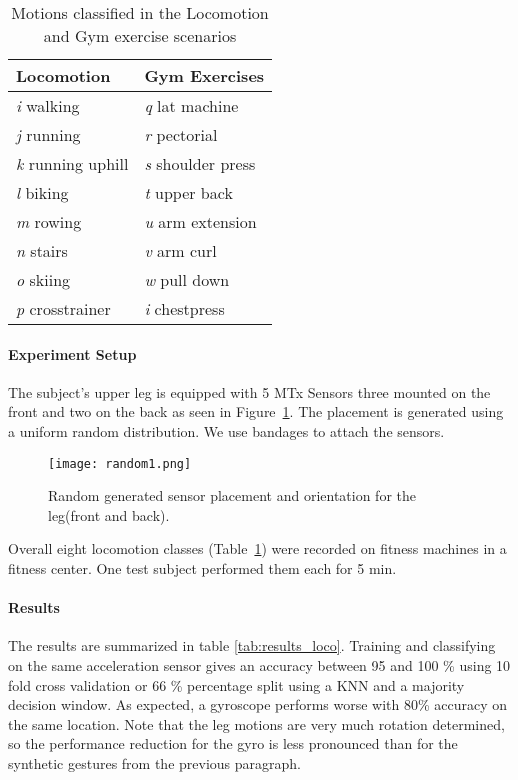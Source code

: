 \begin{table}
\centering 
\caption[Classes assigned in the experiments]{Motions classified in the Locomotion and
  Gym exercise scenarios}
\begin{tabularx}{0.5\textwidth}{ll}\toprule
Locomotion& Gym Exercises\\\midrule \emph{i} walking&\emph{q} lat
machine\\ \emph{j} running&\emph{r} pectorial\\ \emph{k} running
uphill&\emph{s} shoulder press\\ \emph{l} biking&\emph{t} upper
back\\ \emph{m} rowing&\emph{u} arm extension\\ \emph{n}
stairs&\emph{v} arm curl\\ \emph{o} skiing&\emph{w} pull
down\\ \emph{p} crosstrainer&\emph{i} chestpress\\\bottomrule
\end{tabularx}%
\label{tab:classes} 
\end{table}

\paragraph{Experiment Setup}
The subject's upper leg is equipped with 5 MTx Sensors three mounted on the
front and two on the back as seen in Figure~\ref{fig:rand}. The placement is
generated using a uniform random distribution.  We use bandages to attach
the sensors. 
\begin{figure}[t]
\centering   
\texttt{[image: random1.png]}
\caption[Randomly generated placement]{Random generated sensor placement and orientation for the leg(front and back).}
\label{fig:rand}
\end{figure}
Overall eight locomotion classes (Table~\ref{tab:classes}) were recorded
on fitness machines in a  fitness center.
One test subject performed them each for 5 min. 

\paragraph{Results}
The results are summarized in table \ref{tab:results_loco}.
Training and classifying on the same acceleration sensor gives an accuracy between 95  and 100 \% using
10 fold cross validation or 66 \% percentage split using a KNN and a
majority decision window. As expected, a gyroscope performs worse with
80\% accuracy on the same location. Note that the leg motions
are very much rotation determined, so the performance reduction for
the gyro is less pronounced than for the synthetic gestures from the
previous paragraph. 

